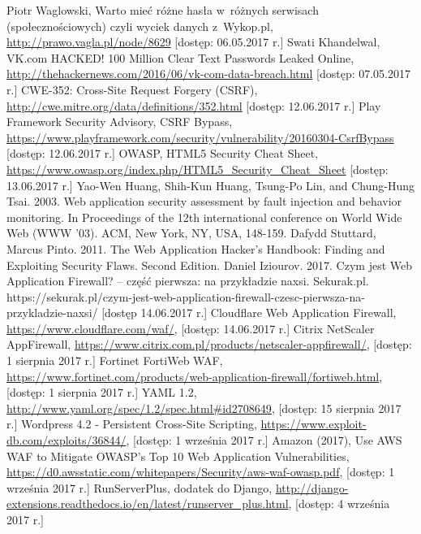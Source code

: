 \documentclass[12pt,a4paper,polish,thesis]{dcsbook}
\begin{document}
\begin{thebibliography}{1}
 Piotr Waglowski, Warto mieć różne hasła w~różnych serwisach (społecznościowych) czyli wyciek danych z~Wykop.pl, \url{http://prawo.vagla.pl/node/8629} [dostęp: 06.05.2017 r.]
 Swati Khandelwal, VK.com HACKED! 100 Million Clear Text Passwords Leaked Online, \url{http://thehackernews.com/2016/06/vk-com-data-breach.html} [dostęp: 07.05.2017 r.]
 CWE-352: Cross-Site Request Forgery (CSRF), \url{http://cwe.mitre.org/data/definitions/352.html} [dostęp: 12.06.2017 r.]
 Play Framework Security Advisory, CSRF Bypass, \url{https://www.playframework.com/security/vulnerability/20160304-CsrfBypass} [dostęp: 12.06.2017 r.]
 OWASP, HTML5 Security Cheat Sheet, \url{https://www.owasp.org/index.php/HTML5\_Security\_Cheat\_Sheet} [dostęp: 13.06.2017 r.]
 Yao-Wen Huang, Shih-Kun Huang, Tsung-Po Lin, and Chung-Hung Tsai. 2003. Web application security assessment by fault injection and behavior monitoring. In Proceedings of the 12th international conference on World Wide Web (WWW '03). ACM, New York, NY, USA, 148-159.
 Dafydd Stuttard, Marcus Pinto. 2011. The Web Application Hacker's Handbook: Finding and Exploiting Security Flaws. Second Edition.
 Daniel Iziourov. 2017. Czym jest Web Application Firewall? – część pierwsza: na przykładzie naxsi. Sekurak.pl. https://sekurak.pl/czym-jest-web-application-firewall-czesc-pierwsza-na-przykladzie-naxsi/ [dostęp 14.06.2017 r.]
 Cloudflare Web Application Firewall, \url{https://www.cloudflare.com/waf/}, [dostęp: 14.06.2017 r.]
 Citrix NetScaler AppFirewall, \url{https://www.citrix.com.pl/products/netscaler-appfirewall/}, [dostęp: 1 sierpnia 2017 r.]
 Fortinet FortiWeb WAF, \url{https://www.fortinet.com/products/web-application-firewall/fortiweb.html}, [dostęp: 1 sierpnia 2017 r.]
 YAML 1.2, \url{http://www.yaml.org/spec/1.2/spec.html#id2708649}, [dostęp: 15 sierpnia 2017 r.]
 Wordpress 4.2 - Persistent Cross-Site Scripting, \url{https://www.exploit-db.com/exploits/36844/}, [dostęp: 1 września 2017 r.]
 Amazon (2017), Use AWS WAF to Mitigate OWASP's Top 10 Web Application Vulnerabilities, \url{https://d0.awsstatic.com/whitepapers/Security/aws-waf-owasp.pdf}, [dostęp: 1 września 2017 r.]
 RunServerPlus, dodatek do Django, \url{http://django-extensions.readthedocs.io/en/latest/runserver_plus.html}, [dostęp: 4 września 2017 r.]
\end{thebibliography}
\end{document}
